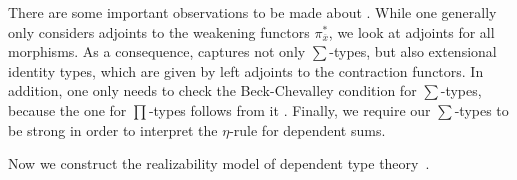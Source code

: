 \documentclass[a4paper,UKenglish,cleveref,numberwithinsect, autoref, thm-restate]{lipics-v2021}
\newcommand{\proj}[1]{\pi_{#1}}
\newcommand{\subst}[1]{#1^*}
\newcommand{\disp}[1]{\overline{#1}}
\newcommand{\xx}{\disp{x}}
\begin{document}
\begin{remark}
There are some important observations to be made about .
While one generally only considers adjoints to the weakening functors $\subst{\proj{\xx}}$,
we look at adjoints for all morphisms.
As a consequence,  captures not only $\sum$-types,
but also extensional identity types,
which are given by left adjoints to the contraction functors.
In addition,
one only needs to check the Beck-Chevalley condition for $\sum$-types,
because the one for $\prod$-types follows from it \cite{seely:1983}.
Finally,
we require our $\sum$-types to be strong in order to interpret the $\eta$-rule for dependent sums.
\end{remark}

Now we construct the realizability model of dependent type theory~\cite{luo:1990,reus:1999a}.
\end{document}
